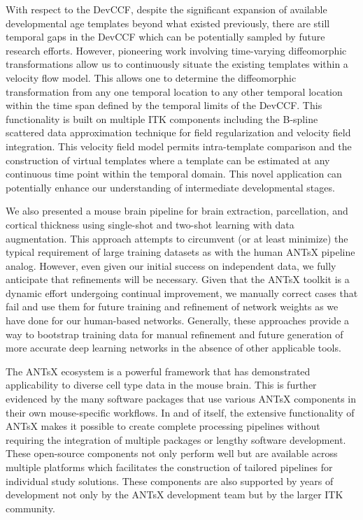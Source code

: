 \documentclass[
  12pt,
]{article}
\begin{document}
With respect to the DevCCF, despite the significant expansion of
available developmental age templates beyond what existed previously,
there are still temporal gaps in the DevCCF which can be potentially
sampled by future research efforts. However, pioneering work involving
time-varying diffeomorphic transformations allow us to continuously
situate the existing templates within a velocity flow model. This allows
one to determine the diffeomorphic transformation from any one temporal
location to any other temporal location within the time span defined by
the temporal limits of the DevCCF. This functionality is built on
multiple ITK components including the B-spline scattered data
approximation technique for field regularization and velocity field
integration. This velocity field model permits intra-template comparison
and the construction of virtual templates where a template can be
estimated at any continuous time point within the temporal domain. This
novel application can potentially enhance our understanding of
intermediate developmental stages.

We also presented a mouse brain pipeline for brain extraction,
parcellation, and cortical thickness using single-shot and two-shot
learning with data augmentation. This approach attempts to circumvent
(or at least minimize) the typical requirement of large training
datasets as with the human ANTsX pipeline analog. However, even given
our initial success on independent data, we fully anticipate that
refinements will be necessary. Given that the ANTsX toolkit is a dynamic
effort undergoing continual improvement, we manually correct cases that
fail and use them for future training and refinement of network weights
as we have done for our human-based networks. Generally, these
approaches provide a way to bootstrap training data for manual
refinement and future generation of more accurate deep learning networks
in the absence of other applicable tools.

The ANTsX ecosystem is a powerful framework that has demonstrated
applicability to diverse cell type data in the mouse brain. This is
further evidenced by the many software packages that use various ANTsX
components in their own mouse-specific workflows. In and of itself, the
extensive functionality of ANTsX makes it possible to create complete
processing pipelines without requiring the integration of multiple
packages or lengthy software development. These open-source components
not only perform well but are available across multiple platforms which
facilitates the construction of tailored pipelines for individual study
solutions. These components are also supported by years of development
not only by the ANTsX development team but by the larger ITK community.
\end{document}
